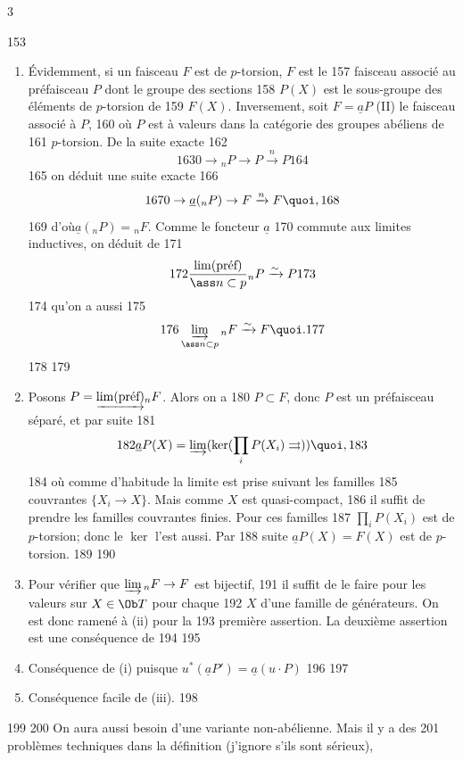 3	\documentclass[10pt]{../fichiers-configuration-latex/smfart}
\begin{document}
   153	\begin{enumerate}
   154	\renewcommand{\theenumi}{\roman{enumi}}
   155	\renewcommand{\labelenumi}{(\theenumi)}
   156	\item Évidemment, si un faisceau $F$ est de $p$-torsion, $F$ est le
   157	  faisceau associé au préfaisceau $P$ dont le groupe des sections
   158	  $P(X)$ est le sous-groupe des éléments de $p$-torsion de
   159	  $F(X)$. Inversement, soit $F=\underline{a}P$ (II) le faisceau associé à $P$,
   160	  où $P$ est à valeurs dans la catégorie des groupes abéliens de
   161	  $p$-torsion. De la suite exacte
   162	$$
   163	0\rightarrow {}_nP \rightarrow P\xrightarrow{n}P
   164	$$
   165	on déduit une suite exacte
   166	$$
   167	0\rightarrow \underline{a}({}_nP)\rightarrow F\xrightarrow{n}F{\quoi},
   168	$$
   169	d'où\pageoriginale $\underline{a}({}_nP)={}_nF$. Comme le foncteur $\underline{a}$
   170	commute aux limites inductives, on déduit de
   171	$$
   172	\frac{\lim(\text{\rm préf})}{\ass n\subset p}{}_nP\xrightarrow{\sim}P
   173	$$
   174	qu'on a aussi
   175	$$
   176	\varinjlim_{\ass n\subset p} {}_nF\xrightarrow{\sim}F{\quoi}.
   177	$$
   178	
   179	\item Posons $P=\underrightarrow{\lim(\text{\rm préf})}{}_n F$. Alors on a
   180	  $P\subset F$, donc $P$ est un préfaisceau séparé, et par suite
   181	$$
   182	\underline{a}P(X)=\varinjlim (\ker(\prod_i P(X_i)\rightrightarrows)){\quoi},
   183	$$
   184	où comme d'habitude la limite est prise suivant les familles
   185	couvrantes $\{X_i\rightarrow X\}$. Mais comme $X$ est quasi-compact,
   186	il suffit de prendre les familles couvrantes finies. Pour ces familles
   187	$\prod_iP(X_i)$ est de $p$-torsion; donc le $\ker$ l'est aussi. Par
   188	suite $\underline{a}P(X)=F(X)$ est de $p$-torsion.
   189	
   190	\item Pour vérifier que $\varinjlim {}_nF\rightarrow F$ est bijectif,
   191	  il suffit de le faire pour les valeurs sur $X\in \Ob T$ pour chaque
   192	  $X$ d'une famille de générateurs. On est donc ramené à (ii) pour la
   193	  première assertion. La deuxième assertion est une conséquence de
   194	
   195	\item Conséquence de (i) puisque $u^{\ast}(\underline{a}P')=\underline{a}(u\cdot P)$
   196	
   197	\item Conséquence facile de (iii).
   198	\end{enumerate}
   199	
   200	On aura aussi besoin d'une variante non-abélienne. Mais il y a des
   201	problèmes techniques dans la définition (j'ignore s'ils sont sérieux),
\end{document}
